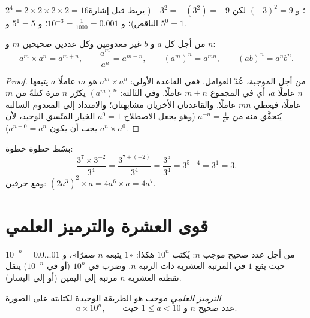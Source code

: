 \begin{example}
$2^4 = 2 \times 2 \times 2 \times 2 = 16$؛ \quad
و $(-3)^2 = 9$ لكن $-3^2 = -(3^2) = -9$ ( يربط قبل
إشارة الناقص)؛ \quad و $10^{-3} = \frac{1}{1000} = 0.001$؛ \quad
و $5^1 = 5$ و $5^0 = 1$.
\end{example}

\begin{theorem}\label{thm:g9:fractions:rules}
من أجل كل $a$ و $b$ غير معدومين وكل عددين صحيحين $m$ و $n$:
\[
a^m \times a^n = a^{m+n},
\qquad
\frac{a^m}{a^n} = a^{m-n},
\qquad
\left(a^m\right)^n = a^{mn},
\qquad
(ab)^n = a^n b^n .
\]
\end{theorem}

\begin{proof}
من أجل  الموجبة، عُدّ العوامل. ففي القاعدة الأولى:
$a^m \times a^n$ هو $m$ عاملًا $a$ يتبعها $n$ عاملًا $a$، أي في المجموع
$m + n$ عاملًا. وفي الثالثة:
$\left(a^m\right)^n$ يكرّر $n$ مرة كتلةً من $m$ عاملًا، فيعطي
$mn$ عاملًا. والقاعدتان الأخريان مشابهتان؛ والامتداد إلى  المعدوم
 السالبة يُتحقَّق منه من $a^{-n} = \frac{1}{a^n}$ (وهو يجعل
الاصطلاح $a^0 = 1$ الخيار المتّسق الوحيد، لأن
$a^n \times a^0$ يجب أن يكون $a^{n+0} = a^n$).
\end{proof}

\begin{example}\label{ex:g9:fractions:rules}
بسّط خطوة خطوة:
\[
\frac{3^7 \times 3^{-2}}{3^4}
= \frac{3^{7 + (-2)}}{3^4}
= \frac{3^5}{3^4}
= 3^{5-4} = 3^1 = 3 .
\]
ومع حرفين: $(2a^3)^2 \times a = 4 a^6 \times a = 4a^7$.
\end{example}

\section{قوى العشرة والترميز العلمي}

\begin{proposition}\label{prop:g9:fractions:ten}
من أجل عدد صحيح موجب $n$: يُكتب $10^n$ هكذا: «$1$ يتبعه $n$
صفرًا»، و $10^{-n} = 0.0\dots01$ حيث يقع $1$ في المرتبة العشرية
ذات الرتبة $n$. وضرب  في $10^n$ (أو في $10^{-n}$) ينقل
نقطته العشرية $n$ مرتبة إلى اليمين (أو إلى اليسار).
\end{proposition}

\begin{definition}\label{def:g9:fractions:scientific}
\emph{الترميز العلمي}  موجب
هو الطريقة الوحيدة لكتابته على الصورة
\[
a \times 10^n,
\qquad\text{حيث } 1 \leq a < 10 \text{ و } n \text{ عدد صحيح.}
\]
\end{definition}


